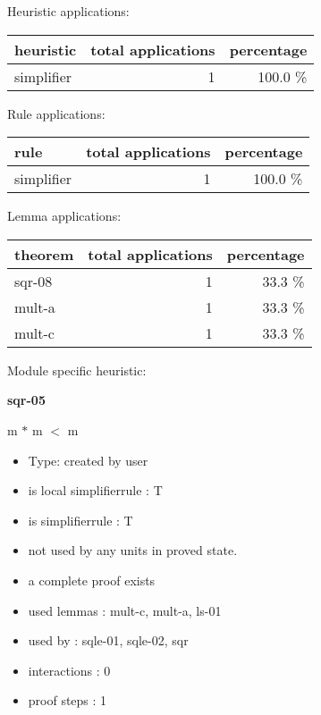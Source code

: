 \documentclass[a4paper]{article}
\begin{document}
\medskip


Heuristic applications:

\begin{supertabular}{l|r|r}
heuristic	& total applications & percentage \\ \hline
simplifier & 1 & 100.0 \% \\

\end{supertabular}

Rule applications:

\begin{supertabular}{l|r|r}
rule	        & total applications & percentage \\ \hline
simplifier & 1 & 100.0 \% \\

\end{supertabular}

Lemma applications:

\begin{supertabular}{l|r|r}
theorem	        & total applications & percentage \\ \hline
sqr-08 & 1 & 33.3 \% \\
mult-a & 1 & 33.3 \% \\
mult-c & 1 & 33.3 \% \\

\end{supertabular}

Module specific heuristic:

\pagebreak

{\LARGE\bf sqr-05}\label{lemma-sqr-05}

\medskip

 \Fol \Not m $*$ m $<$ m

\begin{itemize}

\item Type: created by user

\item is local simplifierrule : T
\item is simplifierrule : T
\item not used by any units in proved state.
\item       a complete proof exists
\item       used lemmas  : mult-c, mult-a, ls-01
\item       used by      : sqle-01, sqle-02, sqr
\item       interactions : 0
\item       proof steps  : 1
\end{itemize}
\end{document}
